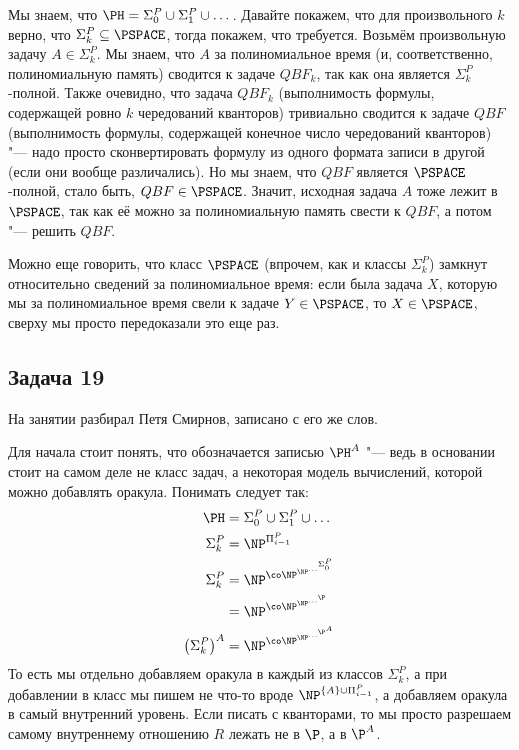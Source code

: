 	Мы знаем, что $\PH=\Sigma_0^P\cup\Sigma_1^P\cup\dots$.
	Давайте покажем, что для произвольного $k$ верно, что $\Sigma_k^P \subseteq \PSPACE$, тогда покажем, что требуется.
	Возьмём произвольную задачу $A \in \Sigma_k^P$.
	Мы знаем, что $A$ за полиномиальное время (и, соответственно, полиномиальную память) сводится к задаче $QBF_k$, так как она является $\Sigma_k^P$-полной.
	Также очевидно, что задача $QBF_k$ (выполнимость формулы, содержащей ровно $k$ чередований кванторов) тривиально сводится к задаче $QBF$
	(выполнимость формулы, содержащей конечное число чередований кванторов) "--- надо просто сконвертировать формулу из одного формата записи в другой (если они вообще различались).
	Но мы знаем, что $QBF$ является $\PSPACE$-полной, стало быть, $QBF \in \PSPACE$.
	Значит, исходная задача $A$ тоже лежит в $\PSPACE$, так как её можно за полиномиальную память свести к $QBF$, а потом "--- решить $QBF$.

	\begin{Rem}
		Можно еще говорить, что класс $\PSPACE$ (впрочем, как и классы $\Sigma_k^P$) замкнут относительно сведений за полиномиальное время:
		если была задача $X$, которую мы за полиномиальное время свели к задаче $Y\in \PSPACE$, то $X \in \PSPACE$, сверху мы просто
		передоказали это еще раз.
	\end{Rem}

\subsection{Задача 19}
	На занятии разбирал Петя Смирнов, записано с его же слов.

	\begin{Rem}
		Для начала стоит понять, что обозначается записью $\PH^A$ "--- ведь в основании стоит на самом деле не класс задач, а некоторая
		модель вычислений, которой можно добавлять оракула.
		Понимать следует так:
		\begin{align*}
			\PH &= \Sigma_0^P \cup \Sigma_1^P \cup \dots \\
			\Sigma_k^P &= \NP^{\Pi_{i-1}^P} \\
			\Sigma_k^P
				&= \NP^{\co\NP^{\NP^{\dots^{\Sigma_0^P}}}} \\
				&= \NP^{\co\NP^{\NP^{\dots^{\P}}}} \\
			\left(\Sigma_k^P\right)^A
				&= \NP^{\co\NP^{\NP^{\dots^{\P^A}}}}
		\end{align*}
		То есть мы отдельно добавляем оракула в каждый из классов $\Sigma_k^P$, а при добавлении в класс мы пишем не
		что-то вроде $\NP^{\{A\}\cup \Pi_{i-1}^P}$, а добавляем оракула в самый внутренний уровень.
		Если писать с кванторами, то мы просто разрешаем самому внутреннему отношению $R$ лежать не в $\P$, а в $\P^A$.
	\end{Rem}

